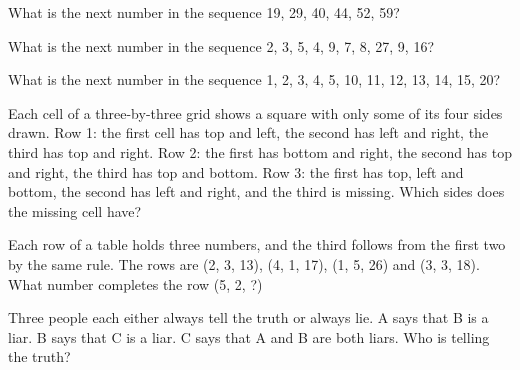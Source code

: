 \begin{question}\label{iq:iv1:sequences-patterns-and-aptitude:18}
What is the next number in the sequence 19, 29, 40, 44, 52, 59?
\end{question}

\begin{question}\label{iq:iv1:sequences-patterns-and-aptitude:19}
What is the next number in the sequence 2, 3, 5, 4, 9, 7, 8, 27, 9, 16?
\end{question}

\begin{question}\label{iq:iv1:sequences-patterns-and-aptitude:20}
What is the next number in the sequence 1, 2, 3, 4, 5, 10, 11, 12, 13, 14, 15, 20?
\end{question}

\begin{question}\label{iq:iv1:sequences-patterns-and-aptitude:21}
Each cell of a three-by-three grid shows a square with only some of its four sides drawn. Row 1: the first cell has top and left, the second has left and right, the third has top and right. Row 2: the first has bottom and right, the second has top and right, the third has top and bottom. Row 3: the first has top, left and bottom, the second has left and right, and the third is missing. Which sides does the missing cell have?
\end{question}

\begin{question}\label{iq:iv1:sequences-patterns-and-aptitude:22}
Each row of a table holds three numbers, and the third follows from the first two by the same rule. The rows are (2, 3, 13), (4, 1, 17), (1, 5, 26) and (3, 3, 18). What number completes the row (5, 2, ?)
\end{question}

\begin{question}\label{iq:iv1:sequences-patterns-and-aptitude:23}
Three people each either always tell the truth or always lie. A says that B is a liar. B says that C is a liar. C says that A and B are both liars. Who is telling the truth?
\end{question}

